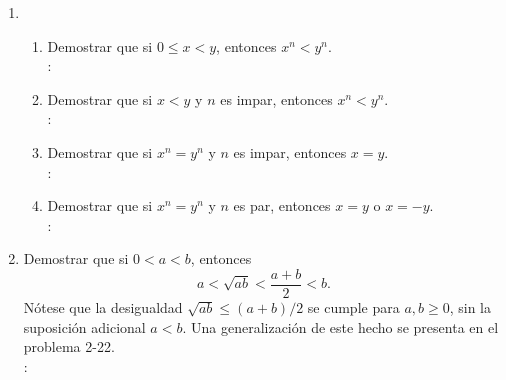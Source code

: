 \begin{enumerate}
\begin{enumerate}[label=\roman*]
    \end{enumerate}
    
    \item
    \begin{enumerate}
        \item Demostrar que si $ 0 \leq x < y $, entonces $ x^n < y^n $. \\
        \solucion: \\
        
        \item Demostrar que si $ x < y $ y $ n $ es impar, entonces $ x^n < y^n $. \\
        \solucion: \\
        
        \item Demostrar que si $ x^n = y^n $ y $ n $ es impar, entonces $ x = y $. \\
        \solucion: \\
        
        \item Demostrar que si $ x^n = y^n $ y $ n $ es par, entonces $ x = y $ o $ x = -y $. \\
        \solucion: \\
        
    \end{enumerate}
    
    \item Demostrar que si $ 0 < a < b $, entonces 
    \begin{displaymath}
        a < \sqrt{ab} < \frac{a+b}{2} < b.
    \end{displaymath}
    Nótese que la desigualdad $ \sqrt{ab} \leq (a+b)/2 $ se cumple para $ a,b \geq 0 $, sin la suposición adicional $ a < b $. Una generalización de este hecho se presenta en el problema 2-22. \\
    \solucion: \\
    
\end{enumerate}